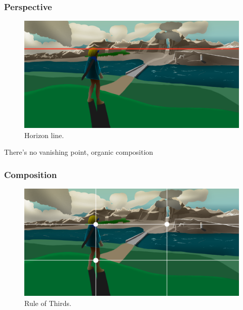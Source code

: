\documentclass{cup-pan}
\begin{document}
        \subsubsection{Perspective}

            \begin{figure}[H]
                \includegraphics[width=\textwidth]{Imagenes/Fanart1/Analysis/horizonte.png}
                \caption{Horizon line.}
            \end{figure}

            There's no vanishing point, organic composition

        \subsubsection{Composition}

            \begin{figure}[H]
                \includegraphics[width=\textwidth]{Imagenes/Fanart1/Analysis/reglatercios.png}
                \caption{Rule of Thirds.}
            \end{figure}
\end{document}
